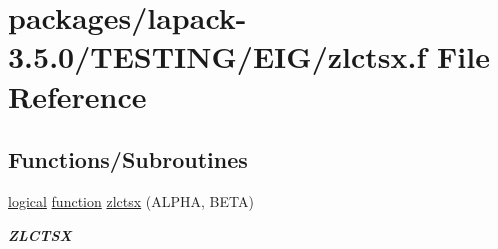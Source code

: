 \hypertarget{zlctsx_8f}{}\section{packages/lapack-\/3.5.0/\+T\+E\+S\+T\+I\+N\+G/\+E\+I\+G/zlctsx.f File Reference}
\label{zlctsx_8f}
\subsection*{Functions/\+Subroutines}
\begin{DoxyCompactItemize}
\item 
\hyperlink{tnc_8c_aa7b64cdf39500931f7b333343791a104}{logical} \hyperlink{afunc_8m_a7b5e596df91eadea6c537c0825e894a7}{function} \hyperlink{group__complex16__eig_gafb3b6ea91b75f8ed29914e8e7169adb3}{zlctsx} (A\+L\+P\+H\+A, B\+E\+T\+A)
\begin{DoxyCompactList}\small\item\em {\bfseries Z\+L\+C\+T\+S\+X} \end{DoxyCompactList}\end{DoxyCompactItemize}
